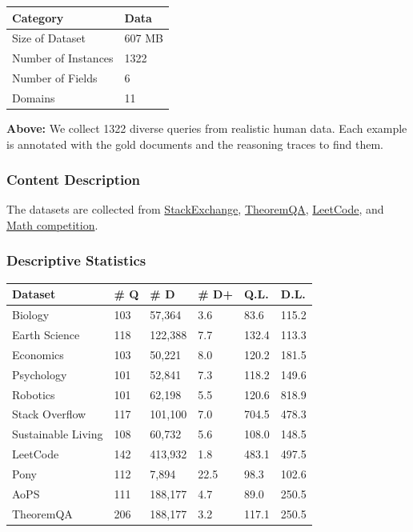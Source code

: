 \begin{tabular}{|l|l|}
\hline
Category & Data \\
\hline
Size of Dataset & 607 MB \\
Number of Instances & 1322 \\
Number of Fields & 6 \\
Domains & 11 \\
\hline
\end{tabular}

\textbf{Above:} We collect 1322 diverse queries from realistic human data. Each example is annotated with the gold documents and the reasoning traces to find them.

\subsubsection{Content Description}
The datasets are collected from \href{https://stackexchange.com/}{StackExchange}, \href{https://arxiv.org/abs/2305.12524}{TheoremQA}, \href{https://leetcode.com/}{LeetCode}, and \href{https://artofproblemsolving.com/}{Math competition}.

\subsubsection{Descriptive Statistics}

\begin{tabular}{|l|l|l|l|l|l|}
\hline
Dataset & \# Q & \# D & \# D+ & Q.L. & D.L. \\
\hline
Biology & 103 & 57,364 & 3.6 & 83.6 & 115.2 \\
Earth Science & 118 & 122,388 & 7.7 & 132.4 & 113.3 \\
Economics & 103 & 50,221 & 8.0 & 120.2 & 181.5 \\
Psychology & 101 & 52,841 & 7.3 & 118.2 & 149.6 \\
Robotics & 101 & 62,198 & 5.5 & 120.6 & 818.9 \\
Stack Overflow & 117 & 101,100 & 7.0 & 704.5 & 478.3 \\
Sustainable Living & 108 & 60,732 & 5.6 & 108.0 & 148.5 \\
LeetCode & 142 & 413,932 & 1.8 & 483.1 & 497.5 \\
Pony & 112 & 7,894 & 22.5 & 98.3 & 102.6 \\
AoPS & 111 & 188,177 & 4.7 & 89.0 & 250.5 \\
TheoremQA & 206 & 188,177 & 3.2 & 117.1 & 250.5 \\
\hline
\end{tabular}

